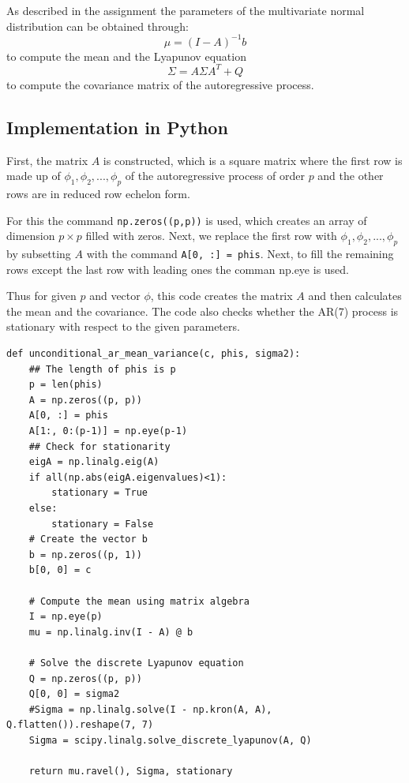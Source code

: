 \documentclass{article}
\begin{document}
As described in the assignment the parameters of the multivariate normal distribution can be obtained through:
\begin{equation}
\mu = (I - A)^{-1}b
\end{equation}
to compute the mean and the Lyapunov equation
\begin{equation}
\Sigma = A \Sigma A^T + Q
\end{equation}
to compute the covariance matrix of the autoregressive process.

\subsection{Implementation in Python}
First, the matrix $A$ is constructed, which is a square matrix where the first row is made up of $\phi_1, \phi_2, ..., \phi_p$ of the autoregressive process of order $p$ and the other rows are in reduced row echelon form.

For this the command \texttt{np.zeros((p,p))} is used, which creates an array of dimension $p \times p$ filled with zeros. 
Next, we replace the first row with $\phi_1, \phi_2, ..., \phi_p$ by subsetting $A$ with the command \texttt{A[0, :] = phis}.
Next, to fill the remaining rows except the last row with leading ones the comman np.eye is used.

Thus for given $p$ and vector $\phi$, this code creates the matrix $A$ and then calculates the mean and the covariance. 
The code also checks whether the AR(7) process is stationary with respect to the given parameters.
\begin{adjustwidth}{-2cm}{-2cm}
\begin{verbatim}
def unconditional_ar_mean_variance(c, phis, sigma2):
    ## The length of phis is p
    p = len(phis)
    A = np.zeros((p, p))
    A[0, :] = phis
    A[1:, 0:(p-1)] = np.eye(p-1)
    ## Check for stationarity
    eigA = np.linalg.eig(A)
    if all(np.abs(eigA.eigenvalues)<1):
        stationary = True
    else:
        stationary = False
    # Create the vector b
    b = np.zeros((p, 1))
    b[0, 0] = c
    
    # Compute the mean using matrix algebra
    I = np.eye(p)
    mu = np.linalg.inv(I - A) @ b
    
    # Solve the discrete Lyapunov equation
    Q = np.zeros((p, p))
    Q[0, 0] = sigma2
    #Sigma = np.linalg.solve(I - np.kron(A, A), Q.flatten()).reshape(7, 7)
    Sigma = scipy.linalg.solve_discrete_lyapunov(A, Q)
    
    return mu.ravel(), Sigma, stationary
\end{verbatim}
\end{adjustwidth}
\end{document}
